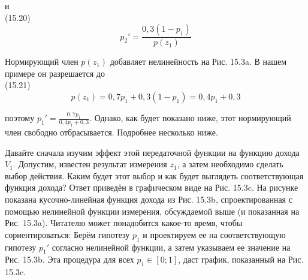 \documentclass[10pt,a4paper]{article}
\begin{document}
и\\

(15.20)
\begin{equation*}
p_2'=\frac{0,3(1-p_1)}{p(z_1)}
\end{equation*}

Нормирующий член $p(z_1)$ добавляет нелинейность на Рис. 15.3a. В нашем примере он разрешается до\\

(15.21)
$$p(z_1)=0,7p_1+0,3(1-p_1)=0,4p_1+0,3$$

поэтому $p_1'=\frac{0,7p_1}{0,4p_1+0,3}$.  Однако, как будет показано ниже, этот нормирующий член 
свободно отбрасывается. Подробнее несколько ниже.

Давайте сначала изучим эффект этой  передаточной функции на функцию дохода $V_1$. Допустим, известен результат измерения $z_1$, а затем необходимо сделать выбор действия. Каким будет этот выбор и как будет выглядеть соответствующая функция дохода? Ответ приведён в графическом виде на Рис. 15.3c. На рисунке показана кусочно-линейная функция дохода из Рис. 15.3b, спроектированная с помощью нелинейной функции измерения, обсуждаемой выше (и показанная на Рис. 15.3a). Читателю может понадобится какое-то время, чтобы сориентироваться: Берём гипотезу $p_1$ и проектируем ее на соответствующую гипотезу $p_1'$ согласно нелинейной функции, а затем указываем ее значение на Рис. 15.3b. Эта процедура для всех $p_1\in[0; 1]$, даст график, показанный на Рис. 15.3c.
\end{document}
